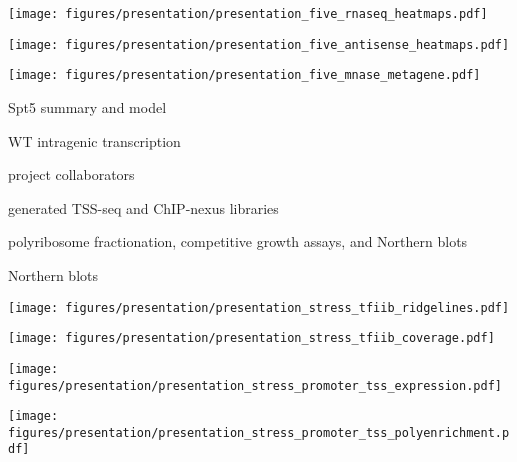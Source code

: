 \documentclass[aspectratio=169]{beamer}
\begin{document}
\begin{frame}[t]
    \centering
    \texttt{[image: figures/presentation/presentation\_five\_rnaseq\_heatmaps.pdf]}
\end{frame}

\begin{frame}[t]
    \texttt{[image: figures/presentation/presentation\_five\_antisense\_heatmaps.pdf]}
\end{frame}

\begin{frame}[t]
    \texttt{[image: figures/presentation/presentation\_five\_mnase\_metagene.pdf]}
\end{frame}

\begin{frame}{Spt5 summary and model}
\end{frame}

\begin{frame}{WT intragenic transcription}
\end{frame}

\begin{frame}{project collaborators}
    \centering
\begin{description}[align=right, labelwidth=5cm, noitemsep, leftmargin=!]
    \item [Steve Doris] generated TSS-seq and ChIP-nexus libraries
    \item [Dan Spatt] polyribosome fractionation, competitive growth assays, and Northern blots
    \item [James Warner] Northern blots
\end{description}

\end{frame}

\begin{frame}[t]
    \texttt{[image: figures/presentation/presentation\_stress\_tfiib\_ridgelines.pdf]}
\end{frame}

\begin{frame}
    \texttt{[image: figures/presentation/presentation\_stress\_tfiib\_coverage.pdf]}
\end{frame}

\begin{frame}[t]
    \texttt{[image: figures/presentation/presentation\_stress\_promoter\_tss\_expression.pdf]}
\end{frame}

\begin{frame}[t]
    \texttt{[image: figures/presentation/presentation\_stress\_promoter\_tss\_polyenrichment.pdf]}
\end{frame}
\end{document}
